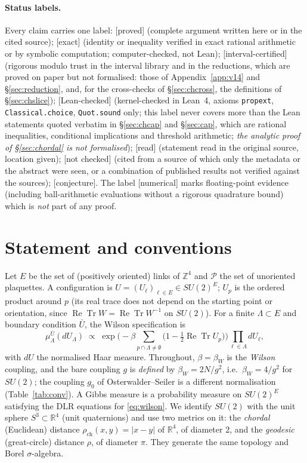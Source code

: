 \documentclass[11pt,a4paper]{article}
\theoremstyle{remark}
\theoremstyle{definition}
\theoremstyle{plain}
\theoremstyle{remark}
\newcommand{\R}{\mathbb{R}}
\newcommand{\Z}{\mathbb{Z}}
\newcommand{\ReTr}{\operatorname{Re}\operatorname{Tr}}
\newcommand{\st}[1]{\textsf{[#1]}}
\newcommand{\rch}{\rho_{\mathrm{ch}}}
\begin{document}
\paragraph{Status labels.}
Every claim carries one label:
\st{proved} (complete argument written here or in the cited source);
\st{exact} (identity or inequality verified in exact rational arithmetic or by symbolic computation; computer-checked, not Lean);
\st{interval-certified} (rigorous modulo trust in the interval library and in the reductions, which are proved on paper but
not formalised: those of Appendix~\ref{app:v14} and \S\ref{sec:reduction}, and, for the cross-checks of \S\ref{sec:chcross},
the definitions of \S\ref{sec:chslice});
\st{Lean-checked} (kernel-checked in Lean~4, axioms \texttt{propext}, \texttt{Classical.choice}, \texttt{Quot.sound} only;
this label never covers more than the Lean statements quoted verbatim in \S\ref{sec:chcap} and \S\ref{sec:cap},
which are rational inequalities, conditional implications and threshold arithmetic; \emph{the analytic proof of
\S\ref{sec:chordal} is not formalised});
\st{read} (statement read in the original source, location given);
\st{not checked} (cited from a source of which only the metadata or the abstract were seen, or a combination of published results not verified against the sources);
\st{conjecture}.
The label \st{numerical} marks floating-point evidence (including ball-arithmetic evaluations without a rigorous quadrature
bound) which is \emph{not} part of any proof.

\section{Statement and conventions}\label{sec:statement}

Let $E$ be the set of (positively oriented) links of $\Z^4$ and $\mathcal P$ the set of unoriented plaquettes.
A configuration is $U=(U_\ell)_{\ell\in E}\in SU(2)^E$; $U_p$ is the ordered product around $p$ (its
real trace does not depend on the starting point or orientation, since $\ReTr W=\ReTr W^{-1}$ on $SU(2)$).
For a finite $\Lambda\subset E$ and boundary condition $\bar U$, the Wilson specification is
\begin{equation}\label{eq:wilson}
  \mu^{\bar U}_{\Lambda}(dU_\Lambda)\;\propto\;
  \exp\Big(-\beta\sum_{p\cap\Lambda\neq\emptyset}\big(1-\tfrac12\ReTr U_p\big)\Big)\prod_{\ell\in\Lambda}dU_\ell ,
\end{equation}
with $dU$ the normalised Haar measure. Throughout, $\beta=\beta_W$ is the \emph{Wilson} coupling, and
the bare coupling $g$ is \emph{defined} by $\beta_W=2N/g^2$, i.e.\ $\beta_W=4/g^2$ for $SU(2)$; the coupling
$g_0$ of Osterwalder--Seiler is a different normalisation (Table~\ref{tab:conv}). A Gibbs measure is a probability measure on $SU(2)^E$ satisfying the
DLR equations for \eqref{eq:wilson}.
We identify $SU(2)$ with the unit sphere $S^3\subset\R^4$ (unit quaternions) and use two metrics on it: the
\emph{chordal} (Euclidean) distance $\rch(x,y)=|x-y|$ of $\R^4$, of diameter $2$, and the \emph{geodesic}
(great-circle) distance $\rho$, of diameter $\pi$. They generate the same topology and Borel $\sigma$-algebra.
\end{document}
